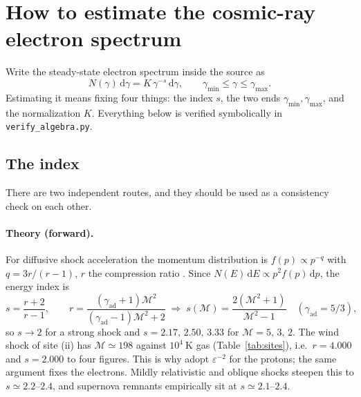 \documentclass[11pt,a4paper]{article}
\begin{document}
\section{How to estimate the cosmic-ray electron spectrum}
\label{sec:est}
Write the steady-state electron spectrum inside the source as
\begin{equation}
  N(\gamma)\,\mathrm d\gamma = K\,\gamma^{-s}\,\mathrm d\gamma ,
  \qquad \gamma_{\min}\le\gamma\le\gamma_{\max}.
  \label{eq:pl}
\end{equation}
Estimating it means fixing four things: the index $s$, the two ends
$\gamma_{\min},\gamma_{\max}$, and the normalization $K$. Everything below is
verified symbolically in \texttt{verify\_algebra.py}.

\subsection{The index}
\label{sec:index}
There are two independent routes, and they should be used as a consistency
check on each other.

\paragraph{Theory (forward).} For diffusive shock acceleration the momentum
distribution is $f(p)\propto p^{-q}$ with $q=3r/(r-1)$, $r$ the compression
ratio \citep{Bell1978,BlandfordOstriker1978,Drury1983}. Since
$N(E)\,\mathrm dE\propto p^{2}f(p)\,\mathrm dp$, the energy index is
\begin{equation}
  s=\frac{r+2}{r-1},
  \qquad
  r=\frac{(\gamma_{\mathrm{ad}}+1)\mathcal M^{2}}
         {(\gamma_{\mathrm{ad}}-1)\mathcal M^{2}+2}
  \;\Longrightarrow\;
  s(\mathcal M)=\frac{2(\mathcal M^{2}+1)}{\mathcal M^{2}-1}
  \quad (\gamma_{\mathrm{ad}}=5/3),
  \label{eq:dsa}
\end{equation}
so $s\to2$ for a strong shock and $s=2.17,\,2.50,\,3.33$ for
$\mathcal M=5,\,3,\,2$. The wind shock of site (ii) has
$\mathcal M\simeq198$ against $10^{4}\ \mathrm{K}$ gas
(Table~\ref{tab:sites}), i.e.\ $r=4.000$ and $s=2.000$ to four figures. This is
why \citet{Kuze2026} adopt $\varepsilon^{-2}$ for the protons; the same argument
fixes the electrons. Mildly relativistic and oblique shocks steepen this to
$s\simeq2.2$--$2.4$, and supernova remnants empirically sit at $s\simeq2.1$--$2.4$.
\end{document}
